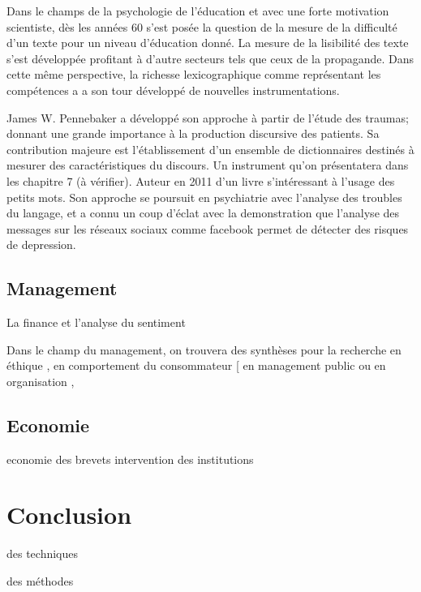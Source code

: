 \documentclass[
]{book}
\begin{document}
Dans le champs de la psychologie de l'éducation et avec une forte motivation scientiste, dès les années 60 s'est posée la question de la mesure de la difficulté d'un texte pour un niveau d'éducation donné. La mesure de la lisibilité des texte s'est développée profitant à d'autre secteurs tels que ceux de la propagande. Dans cette même perspective, la richesse lexicographique comme représentant les compétences a a son tour développé de nouvelles instrumentations.

James W. Pennebaker a développé son approche à partir de l'étude des traumas; donnant une grande importance à la production discursive des patients. Sa contribution majeure est l'établissement d'un ensemble de dictionnaires destinés à mesurer des caractéristiques du discours. Un instrument qu'on présentatera dans les chapitre 7 (à vérifier). Auteur en 2011 d'un livre s'intéressant à l'usage des petits mots. Son approche se poursuit en psychiatrie avec l'analyse des troubles du langage, et a connu un coup d'éclat avec la demonstration que l'analyse des messages sur les réseaux sociaux comme facebook permet de détecter des risques de depression.

\hypertarget{management}{%
\subsection{Management}\label{management}}

La finance et l'analyse du sentiment

Dans le champ du management, on trouvera des synthèses pour la recherche en éthique \citep{lock_quantitative_2015}, en comportement du consommateur {[}\citet{humphreys_automated_2018} en management public \citep{anastasopoulos_computational_2017} ou en organisation \citep{kobayashi_text_2018} ,

\hypertarget{economie}{%
\subsection{Economie}\label{economie}}

economie des brevets
intervention des institutions

\hypertarget{conclusion}{%
\section{Conclusion}\label{conclusion}}

des techniques

des méthodes
\end{document}
